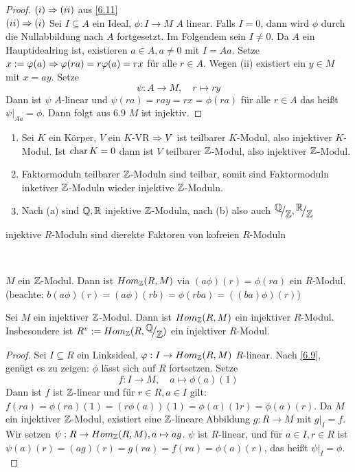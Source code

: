 \begin{proof}
	$(i) \Rightarrow (ii) $ aus \ref{6.11} \\
	$(ii) \Rightarrow (i) $ Sei $ I \subseteq A $ ein Ideal, $\phi: I \to M $ $A$ linear. Falls $ I = 0 $, dann wird $\phi $ durch die Nullabbildung nach $A$ fortgesetzt. Im Folgendem sein $ I \neq 0 $. Da $A$ ein Hauptidealring ist, existieren $ a\in A, a\neq 0 $ mit $I =Aa$. Setze $ x:= \varphi(a) \Rightarrow \varphi(ra)=r\varphi(a) = rx $ für alle $ r \in A$. Wegen (ii) existiert ein $y \in M $ mit $ x = ay $. Setze $$\psi: A \to M,\quad  r \mapsto ry$$
	Dann ist $\psi$ $A$-linear und $ \psi(ra)=  ray = rx = \phi(ra) $ für alle $r \in A $ das heißt $\psi|_{Aa} = \phi.$ Dann folgt aus 6.9 $M$ ist injektiv. 
\end{proof}
\begin{bsp}
	\begin{enumerate} [label= \alph*)]
		\item Sei $K$ ein Körper, $V$ ein $K$-VR $\Rightarrow V$ ist teilbarer $K$-Modul, also injektiver $K$-Modul. Ist $\operatorname{char} K = 0 $ dann ist $V$ teilbarer $\mathbb{Z}$-Modul, also injektiver $\mathbb{Z}$-Modul. 
		\item Faktormoduln teilbarer $\mathbb{Z}$-Moduln sind teilbar, somit sind Faktormoduln inketiver $\mathbb{Z}$-Moduln wieder injektive $\mathbb{Z}$-Moduln. 
		\item Nach (a) sind $\mathbb{Q}, \mathbb{R} $ injektive $\mathbb{Z}$-Moduln, nach (b) also auch $\QR{\Q}{\Z}, \QR{\R}{\Z}$
	\end{enumerate}
\end{bsp}
\begin{Ziel}
	injektive $R$-Moduln sind dierekte Faktoren von kofreien $R$-Moduln 
\end{Ziel} \\
\begin{anm}
	$M$ ein $\mathbb{Z}$-Modul. Dann ist $Hom_{\mathbb{Z}}(R,M)$ via $(a\phi)(r) = \phi(ra) $ ein $R$-Modul. (beachte: $b(a\phi)(r) = (a\phi)(rb) = \phi(rba) = ((ba)\phi)(r) $)
\end{anm}
\begin{bem}\label{6.14}
	Sei $M$ ein injektiver $\mathbb{Z}$-Modul. Dann ist $Hom_{\mathbb{Z}}(R,M)$ ein injektiver $R$-Modul. Insbesondere ist $R^{v} := Hom_{\Z}(R, \QR{\Q}{\Z}) $ ein injektiver $R$-Modul.
\end{bem}
\begin{proof}
	Sei $ I \subseteq R $ ein Linksideal, $\varphi: I \to Hom_{\mathbb{Z}}(R,M) $ $R$-linear. Nach \ref{6.9}, genügt es zu zeigen: $\phi$ lässt sich auf $R$ fortsetzen. Setze $$f: I \to M ,\quad a \mapsto \phi(a)(1)$$ Dann ist $f $ ist $\mathbb{Z}$-linear und für $r \in R , a \in I $ gilt: $ f(ra) = \phi(ra)(1)= (r\phi(a))(1) = \phi(a)(1 r) = \phi(a)(r)$. Da $M$ ein injektiver $\mathbb{Z}$-Modul, existiert eine $\mathbb{Z}$-lineare Abbildung $g: R \to M $ mit $g\big|_I=f $. Wir setzen $\psi: R \to Hom_{\mathbb{Z}}(R,M), a \mapsto ag $. $\psi$ ist $R$-linear, und für $a\in I, r \in R $ ist $\psi(a)(r) =(ag)(r) = g(ra) = f(ra) = \phi(a)(r)$, das heißt $\psi\big|_{I}=\phi.$
\end{proof}
